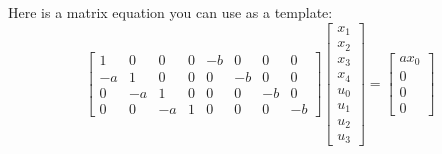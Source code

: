 Here is a matrix equation you can use as a template:
\begin{equation}
\begin{bmatrix}
 1 &  0 &  0 & 0 & -b &  0 &  0 &  0 \\
-a &  1 &  0 & 0 &  0 & -b &  0 &  0 \\
 0 & -a &  1 & 0 &  0 &  0 & -b &  0 \\
 0 &  0 & -a & 1 &  0 &  0 &  0 & -b                                
\end{bmatrix}
\begin{bmatrix} x_1 \\ x_2 \\ x_3 \\ x_4 \\ u_0 \\ u_1 \\ u_2 \\ u_3 \end{bmatrix}
=
\begin{bmatrix}
ax_0 \\ 0 \\ 0 \\ 0      
\end{bmatrix}
\end{equation}